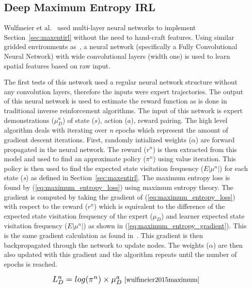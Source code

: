 \documentclass[12pt,american]{report}
\providecommand{\DIFaddend}{} %
\DeclareRobustCommand{\DIFaddend}{\DIFOaddend \let\includegraphics\DIFOincludegraphics} %
\begin{document}
\DIFaddend \label{sec:maxentdeepirl}
\subsection{Deep Maximum Entropy IRL}
Wulfmeier et al.~\cite{wulfmeier2015maximum} used multi-layer neural networks to implement Section~\ref{sec:maxentirl} without the need to hand-craft features. Using similar gridded environments as~\cite{ziebart2008maximum}, a neural network (specifically a Fully Convolutional Neural Network) with wide convolutional layers (width one) is used to learn spatial features based on raw input.  

The first tests of this network used a regular neural network structure without any convolution layers, therefore the inputs were expert trajectories. The output of this neural network is used to estimate the reward function as is done in traditional inverse reinforcement algorithms. The input of this network is expert demonstrations ($\mu_{D}^{a}$) of state ($s$), action ($a$), reward pairing. The high level algorithm deals with iterating over \textit{n} epochs which represent the amount of gradient descent iterations. First, randomly intialized weights ($\alpha$) are forward propagated in the neural network.  The reward ($r^n$) is then extracted from this model and used to find an approximate policy ($\pi^n$) using value iteration. This policy is then used to find the expected state visitation frequency ($E|\mu^n|$) for each state (\textit{s}) as defined in Section~\ref{sec:maxentirl}.  The maximum entropy loss is found by (\ref{eq:maximum_entropy_loss}) using maximum entropy theory. The gradient is computed by taking the gradient of (\ref{eq:maximum_entropy_loss}) with respect to the reward ($r^n$) which is equivalent to the difference of the expected state visitation frequency of the expert ($\mu_D$) and learner expected state visitation frequency ($E|\mu^n|$) as shown in (\ref{eq:maximum_entropy_gradient}).  This is the same gradient calculation as found in~\cite{ziebart2008maximum}.  This gradient is then backpropagated through the network to update nodes.  The weights ($\alpha$) are then also updated with this gradient and the algorithm repeats until the number of epochs is reached. 

\begin{equation}
            \label{eq:maximum_entropy_loss}
            \resizebox{0.3\textwidth}{!}{$L_{D}^{n}=log(\pi^n) \times \mu_{D}^{a} $}~\cite{wulfmeier2015maximum}%
        \end{equation}
\end{document}
